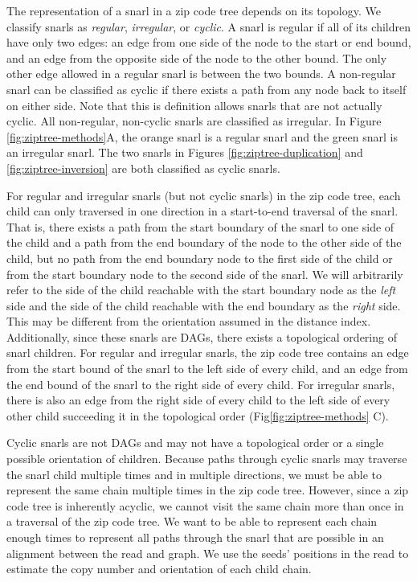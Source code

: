 \documentclass[11pt]{ucscthesis}
\begin{document}
The representation of a snarl in a zip code tree depends on its topology.
We classify snarls as \emph{regular}, \emph{irregular}, or \emph{cyclic}.
A snarl is regular if all of its children have only two edges: an edge from one side of the node to the start or end bound, and an edge from the opposite side of the node to the other bound.
The only other edge allowed in a regular snarl is between the two bounds.
A non-regular snarl can be classified as cyclic if there exists a path from any node back to itself on either side.
Note that this is definition allows snarls that are not actually cyclic.
All non-regular, non-cyclic snarls are classified as irregular.
In Figure \ref{fig:ziptree-methods}A, the orange snarl is a regular snarl and the green snarl is an irregular snarl.
The two snarls in Figures \ref{fig:ziptree-duplication} and \ref{fig:ziptree-inversion} are both classified as cyclic snarls.

For regular and irregular snarls (but not cyclic snarls) in the zip code tree, each child can only traversed in one direction in a start-to-end traversal of the snarl.
That is, there exists a path from the start boundary of the snarl to one side of the child and a path from the end boundary of the node to the other side of the child, but no path from the end boundary node to the first side of the child or from the start boundary node to the second side of the snarl.
We will arbitrarily refer to the side of the child reachable with the start boundary node as the \emph{left} side and the side of the child reachable with the end boundary as the \emph{right} side. 
This may be different from the orientation assumed in the distance index.
Additionally, since these snarls are DAGs, there exists a topological ordering of snarl children.
For regular and irregular snarls, the zip code tree contains an edge from the start bound of the snarl to the left side of every child, and an edge from the end bound of the snarl to the right side of every child.
For irregular snarls, there is also an edge from the right side of every child to the left side of every other child succeeding it in the topological order (Fig\ref{fig:ziptree-methods} C).

Cyclic snarls are not DAGs and may not have a topological order or a single possible orientation of children.
Because paths through cyclic snarls may traverse the snarl child multiple times and in multiple directions, we must be able to represent the same chain multiple times in the zip code tree.
However, since a zip code tree is inherently acyclic, we cannot visit the same chain more than once in a traversal of the zip code tree.
We want to be able to represent each chain enough times to represent all paths through the snarl that are possible in an alignment between the read and graph.
We use the seeds' positions in the read to estimate the copy number and orientation of each child chain.
\end{document}
